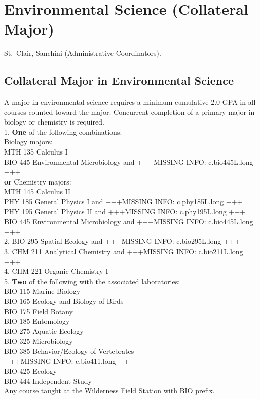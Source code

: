 \documentclass[
  letterpaper,
]{scrbook}
\begin{document}
\section{Environmental Science (Collateral
Major)}\label{sec-environmental-science}

St.~Clair, Sanchini (Administrative Coordinators).

\subsection{Collateral Major in Environmental
Science}\label{collateral-major-in-environmental-science}

A major in environmental science requires a minimum cumulative 2.0 GPA
in all courses counted toward the major. Concurrent completion of a
primary major in biology or chemistry is required.\\
1. \textbf{One} of the following combinations:\\
Biology majors:\\
MTH 135 Calculus I\\
BIO 445 Environmental Microbiology and +++MISSING INFO: c.bio445L.long
+++\\
\textbf{or} Chemistry majors:\\
MTH 145 Calculus II\\
PHY 185 General Physics I and +++MISSING INFO: c.phy185L.long +++\\
PHY 195 General Physics II and +++MISSING INFO: c.phy195L.long +++\\
BIO 445 Environmental Microbiology and +++MISSING INFO: c.bio445L.long
+++\\
2. BIO 295 Spatial Ecology and +++MISSING INFO: c.bio295L.long +++\\
3. CHM 211 Analytical Chemistry and +++MISSING INFO: c.bio211L.long
+++\\
4. CHM 221 Organic Chemistry I\\
5. \textbf{Two} of the following with the associated laboratories:\\
BIO 115 Marine Biology\\
BIO 165 Ecology and Biology of Birds\\
BIO 175 Field Botany\\
BIO 185 Entomology\\
BIO 275 Aquatic Ecology\\
BIO 325 Microbiology\\
BIO 385 Behavior/Ecology of Vertebrates\\
+++MISSING INFO: c.bio411.long +++\\
BIO 425 Ecology\\
BIO 444 Independent Study\\
Any course taught at the Wilderness Field Station with BIO prefix.
\end{document}

